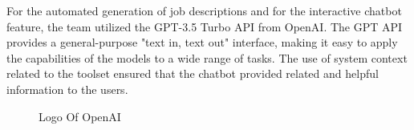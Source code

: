 \newpage
For the automated generation of job descriptions and for the interactive chatbot feature, the team utilized the {\color{purple}GPT-3.5 Turbo API} from OpenAI\cite{openai}. The GPT API provides a general-purpose "text in, text out" interface, making it easy to apply the capabilities of the models to a wide range of tasks. The use of system context related to the  toolset ensured that the chatbot provided related and helpful information to the users.

\begin{figure}[H]
    \centering
    \caption{  Logo Of OpenAI }
    \label{fig: OpenAI_Logo}
\end{figure}



